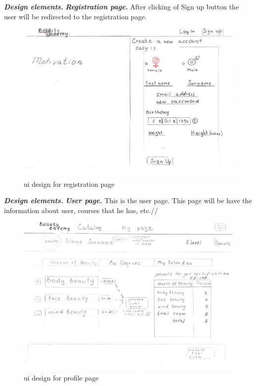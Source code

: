 \documentclass{scrartcl}
\begin{document}
\textbf{\textit{Design elements.}}
\textbf{\textit{Registration page.}}
After clicking of Sign up button the user will be redirected to the registration page.\\
\begin{figure}[H]
\centering
\includegraphics[width = 140mm]{proto-foto/ui-reg.JPG}
\caption{ui design for registration page}
\label{registration page}
\end{figure}

\textbf{\textit{Design elements.}}
\textbf{\textit{User page.}}
This is the user page. This page will be have the information about user, courses that he has, etc.//
\begin{figure}[H]
\centering
\includegraphics[width = 140mm]{proto-foto/ui-user-page.JPG}
\caption{ui design for profile page}
\label{user page}
\end{figure}
\end{document}
